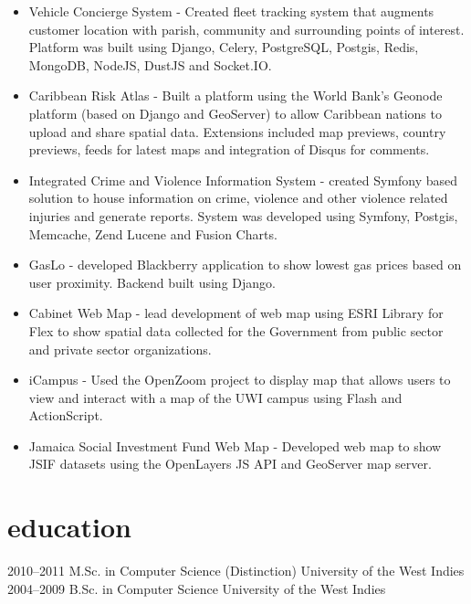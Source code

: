 \documentclass[]{cv-style}          %
\begin{document}
\begin{entrylist}
{\begin{itemize}
\item Vehicle Concierge System - Created fleet tracking system that augments customer location with parish, community and surrounding points of interest. Platform was built using Django, Celery, PostgreSQL, Postgis, Redis, MongoDB, NodeJS, DustJS and Socket.IO. 
\item Caribbean Risk Atlas - Built a platform using the World Bank's Geonode platform (based on Django and GeoServer) to allow Caribbean nations to upload and share spatial data. Extensions included map previews, country previews, feeds for latest maps and integration of Disqus for comments.
\item Integrated Crime and Violence Information System - created Symfony based solution to house information on crime, violence and other violence related injuries and generate reports. System was developed using Symfony, Postgis, Memcache, Zend Lucene and Fusion Charts.
\item GasLo - developed Blackberry  application  to  show  lowest  gas  prices  based  on  user proximity. Backend built using Django.
\item Cabinet Web Map - lead development of web map using ESRI Library for Flex to show spatial data collected for the Government from public sector and private sector organizations.
\item iCampus - Used the OpenZoom project to display map that allows users to view and interact with a map of the UWI campus using Flash and ActionScript.
\item Jamaica Social Investment Fund Web Map - Developed web map to show JSIF datasets using the OpenLayers JS API and GeoServer map server. 
\end{itemize}
}
\end{entrylist}


\section{education}

\begin{entrylist}
\entry
{2010--2011}
{M.Sc. {\normalfont in Computer Science (Distinction)}}
{University of the West Indies}
{\vspace{-0.3cm}}
\entry
{2004--2009}
{B.Sc. {\normalfont in Computer Science}}
{University of the West Indies}
{}
\end{entrylist}
\end{document}
